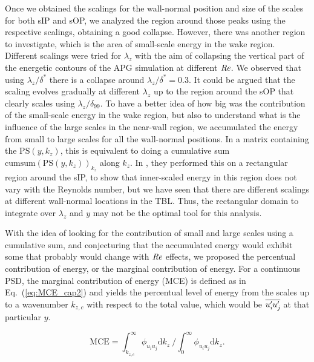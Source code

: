 Once we obtained the scalings for the wall-normal position and size of the scales for both sIP and sOP, we analyzed the region around those peaks using the respective scalings, obtaining a good collapse. However, there was another region to investigate, which is the area of small-scale energy in the wake region.
Different scalings were tried for $\lambda_z$ with the aim of collapsing the vertical part of the energetic contours of the APG simulation at different $\mbox{\textit{Re}}$.
We observed that using $\lambda_z/\delta^*$ there is a collapse around $\lambda_z/\delta^*=0.3$. It could be argued that the scaling evolves gradually at different $\lambda_z$ up to the region around the sOP that clearly scales using $\lambda_z/\delta_{99}$.
To have a better idea of how big was the contribution of the small-scale energy in the wake region, but also to understand what is the influence of the large scales in the near-wall region, we accumulated the energy from small to large scales for all the wall-normal positions. In a matrix containing the $\mathrm{PS}(y,k_z)$, this is equivalent to doing a cumulative sum $\text{cumsum}(\mathrm{PS}(y,k_z))_{k_z}$ along $k_z$.
In \cite{EAmorZPG}, they performed this on a rectangular region around the sIP, to show that inner-scaled energy in this region does not vary with the Reynolds number, but we have seen that there are different scalings at different wall-normal locations in the TBL. Thus, the rectangular domain to integrate over $\lambda_z$ and $y$ may not be the optimal tool for this analysis.

With the idea of looking for the contribution of small and large scales using a cumulative sum, and conjecturing that the accumulated energy would exhibit some that probably would change with $\mbox{\textit{Re}}$ effects, we proposed the percentual contribution of energy, or the marginal contribution of energy.
For a continuous PSD, the marginal contribution of energy (MCE) is defined as in Eq.~(\ref{eq:MCE_cap2}) and yields the percentual level of energy from the scales up to a wavenumber $k_{z,c}$ with respect to the total value, which would be $\overline{u_i^{\prime}\mkern-1.2mu u_j^{\prime}\mkern-1.2mu}$ at that particular $y$.

\begin{equation}
\mathrm{MCE} = \int_{k_{z,c}}^{\infty} \phi_{u_iu_j} \mathrm{d} k_z \ \bigg/ \int_{0}^{\infty} \phi_{u_iu_j} \mathrm{d} k_z.
\label{eq:MCE_cap2}
\end{equation}

